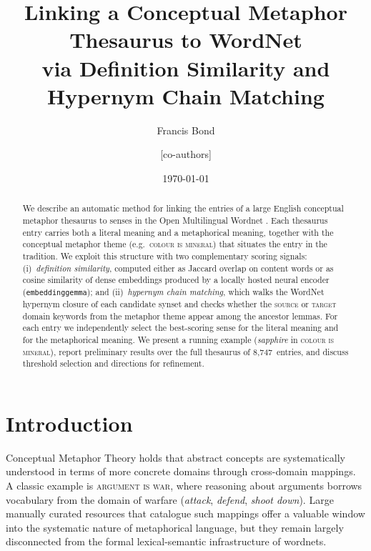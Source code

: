 \documentclass[11pt,a4paper]{article}
\title{Linking a Conceptual Metaphor Thesaurus to WordNet\\
       via Definition Similarity and Hypernym Chain Matching}
\author{Francis Bond \and [co-authors]}
\date{\today}
\begin{document}
\maketitle

\begin{abstract}
We describe an automatic method for linking the entries of a large
English conceptual metaphor thesaurus to senses in the Open Multilingual
Wordnet \citep{bond-foster-2013-linking}.
Each thesaurus entry carries both a literal meaning and a metaphorical
meaning, together with the conceptual metaphor theme (e.g.\
\textsc{colour is mineral}) that situates the entry in the
\citealt{lakoff-johnson-1980} tradition.
We exploit this structure with two complementary scoring signals:
(i)~\emph{definition similarity}, computed either as Jaccard overlap on
content words or as cosine similarity of dense embeddings produced by a
locally hosted neural encoder (\texttt{embeddinggemma}); and
(ii)~\emph{hypernym chain matching}, which walks the WordNet hypernym
closure of each candidate synset and checks whether the \textsc{source}
or \textsc{target} domain keywords from the metaphor theme appear among
the ancestor lemmas.
For each entry we independently select the best-scoring sense for the
literal meaning and for the metaphorical meaning.
We present a running example (\emph{sapphire} in \textsc{colour is mineral}),
report preliminary results over the full thesaurus of 8,747~entries, and
discuss threshold selection and directions for refinement.
\end{abstract}

\section{Introduction}
\label{sec:intro}

Conceptual Metaphor Theory \citep{lakoff-johnson-1980} holds that
abstract concepts are systematically understood in terms of more concrete
domains through cross-domain mappings.
A classic example is \textsc{argument is war}, where reasoning about
arguments borrows vocabulary from the domain of warfare
(\emph{attack}, \emph{defend}, \emph{shoot down}).
Large manually curated resources that catalogue such mappings offer a
valuable window into the systematic nature of metaphorical language, but
they remain largely disconnected from the formal lexical-semantic
infrastructure of wordnets.
\end{document}

